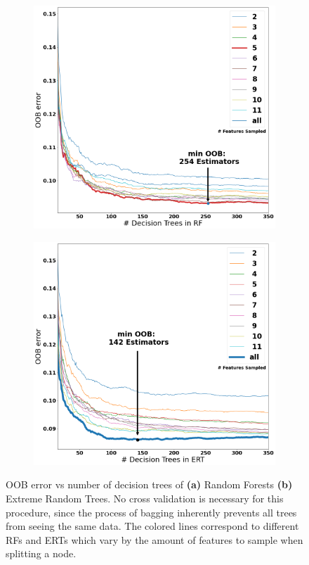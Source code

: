 \documentclass[a4paper, twoside, final, 12pt]{article}
\begin{document}
{\begin{figure}
	\begin{subfigure}{0.48\linewidth}
		\centering
		\includegraphics[scale=0.2]{./src/RF_oob_error}
				\caption{}
		\label{subfig:RF_oob}
	\end{subfigure}
	\begin{subfigure}{0.5\linewidth}
		\centering
		\includegraphics[scale=0.2]{./src/ERT_oob_error}
				\caption{}
		\label{subfig:ERT_oob}
	\end{subfigure}
	\caption{OOB error vs number of decision trees of \textbf{(a)} Random Forests \textbf{(b)} Extreme Random Trees. No cross validation is necessary for this procedure, since the process of bagging inherently prevents all trees from seeing the same data. The colored lines correspond to different RFs and ERTs which vary by the amount of features to sample when splitting a node.}
	\label{fig:RF_exp}
\end{figure}

}
\end{document}
